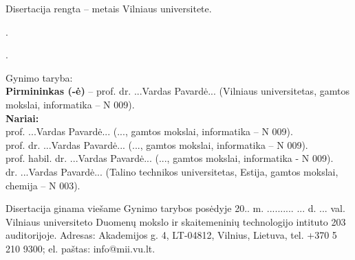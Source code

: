 \newpage
\thispagestyle{empty}                   %

\noindent\nohyphens{Disertacija rengta {\thesisPreparationStartYear} -- {\thesisYear} metais Vilniaus universitete.}


\vspace{1cm}
.

.

\vspace{1cm}
\noindent
Gynimo taryba:  \\
{\bf Pirmininkas (-ė)} {-- {prof. dr. ...Vardas Pavardė...} (Vilniaus universitetas, gamtos mokslai, informatika -- N 009).\\}
{\bf Nariai:}\\ %
{prof. ...Vardas Pavardė...}
(..., gamtos mokslai, informatika -- N 009).\\
{prof. dr. ...Vardas Pavardė...}
(..., gamtos mokslai, informatika – N 009).\\
{prof. habil. dr. ...Vardas Pavardė...}
(..., gamtos mokslai, informatika - N 009).\\
{dr. ...Vardas Pavardė...}
(Talino technikos universitetas, Estija, gamtos mokslai, chemija -- N 003).


\vspace{2cm}
\noindent
Disertacija ginama viešame Gynimo tarybos posėdyje 20.. m. .......... ... d. ... val. Vilniaus universiteto Duomenų mokslo ir skaitemeninių technologijo intituto  203 auditorijoje. Adresas: Akademijos g. 4, LT-04812, Vilnius, Lietuva, tel. +370 5 210 9300; el. paštas: info@mii.vu.lt.\\

